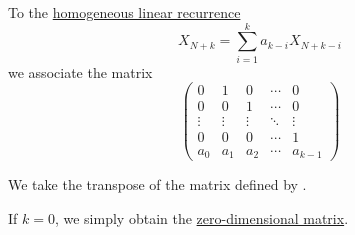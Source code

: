 \begin{definition}\label{def:homogeneous_linear_recurrence_matrix}\mimprovised
  To the \hyperref[def:homogeneous_linear_recurrence]{homogeneous linear recurrence}
  \begin{equation*}
    X_{N+k} = \sum_{i=1}^k a_{k-i} X_{N+k-i}
  \end{equation*}
  we associate the matrix
  \begin{equation}\label{eq:def:homogeneous_linear_recurrence}
    \begin{pmatrix}
      0      & 1      & 0      & \cdots & 0      \\
      0      & 0      & 1      & \cdots & 0      \\
      \vdots & \vdots & \vdots & \ddots & \vdots \\
      0      & 0      & 0      & \cdots & 1      \\
      a_0    & a_1    & a_2    & \cdots & a_{k-1}
    \end{pmatrix}
  \end{equation}
\end{definition}
\begin{comments}
  \item We take the transpose of the matrix defined by .
  \item If \( k = 0 \), we simply obtain the \hyperref[ex:def:array/zero_dimensional]{zero-dimensional matrix}.
\end{comments}

